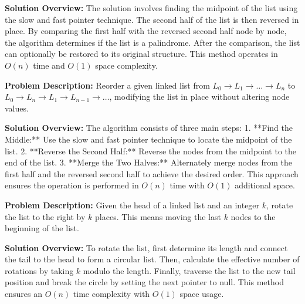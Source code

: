 \textbf{Solution Overview:}  
The solution involves finding the midpoint of the list using the slow and fast pointer technique. The second half of the list is then reversed in place. By comparing the first half with the reversed second half node by node, the algorithm determines if the list is a palindrome. After the comparison, the list can optionally be restored to its original structure. This method operates in \(O(n)\) time and \(O(1)\) space complexity.


\textbf{Problem Description:}  
Reorder a given linked list from \(L_0 \rightarrow L_1 \rightarrow \dots \rightarrow L_n\) to \(L_0 \rightarrow L_n \rightarrow L_1 \rightarrow L_{n-1} \rightarrow \dots\), modifying the list in place without altering node values.

\textbf{Solution Overview:}  
The algorithm consists of three main steps:  
1. **Find the Middle:** Use the slow and fast pointer technique to locate the midpoint of the list.  
2. **Reverse the Second Half:** Reverse the nodes from the midpoint to the end of the list.  
3. **Merge the Two Halves:** Alternately merge nodes from the first half and the reversed second half to achieve the desired order.  
This approach ensures the operation is performed in \(O(n)\) time with \(O(1)\) additional space.


\textbf{Problem Description:}  
Given the head of a linked list and an integer \(k\), rotate the list to the right by \(k\) places. This means moving the last \(k\) nodes to the beginning of the list.

\textbf{Solution Overview:}  
To rotate the list, first determine its length and connect the tail to the head to form a circular list. Then, calculate the effective number of rotations by taking \(k\) modulo the length. Finally, traverse the list to the new tail position and break the circle by setting the next pointer to null. This method ensures an \(O(n)\) time complexity with \(O(1)\) space usage.

